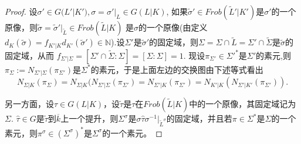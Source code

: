 \documentclass[UTF8]{article}
\begin{document}
\begin{proof}
	设$\sigma'\in G(L'|K'),\sigma=\sigma'|_{L}\in G(L|K)$,
	如果$\tilde{\sigma}'\in Frob(\widetilde{L}'|K')$是$\sigma'$的一个原像，则$\tilde{\sigma}=\tilde{\sigma}'|_{\widetilde{L}}\in Frob(\widetilde{L}|K)$
是$\sigma$的一个原像(由定义$d_{K}(\tilde{\sigma})=f_{K'|K}d_{K'}(\tilde{\sigma}')\in \mathbb{N}$).设$\Sigma'$是$\tilde{\sigma}'$的固定域，则$\Sigma=\Sigma\cap \widetilde{L}=\Sigma'\cap \widetilde{\Sigma}$是$\tilde{\sigma}$的固定域，从而
$f_{\Sigma'|\Sigma}=[\Sigma'\cap \widetilde{\Sigma}:\Sigma]=[\Sigma:\Sigma]=1.$
现设$\pi_{\Sigma'}\in \Sigma'^{*}$是$\Sigma'$的素元,则$\pi_{\Sigma}:=N_{\Sigma'|\Sigma}(\pi_{\Sigma'})$是$\Sigma^{*}$的素元，于是上面左边的交换图由下述等式看出$$
N_{\Sigma|K}(\pi_{\Sigma})=N_{\Sigma|K}(N_{\Sigma'|\Sigma}(\pi_{\Sigma'})=N_{\Sigma'|K}(\pi_{\Sigma'})=N_{K'|K}(N_{\Sigma'|K'}(\pi_{\Sigma'})).
$$

另一方面，设$\tau\in G(L|K)$，设$\tilde{\tau}$是$\tau$在$Frob(\widetilde{L}|K)$中的一个原像，其固定域记为$\Sigma$. $\hat{\tau}\in G$是$\tilde{\tau}$到$\overline{k}$上一个提升，则$\Sigma^{\sigma}$是$\sigma\hat{\tau}\sigma^{-1}|_{\widetilde{L}^{\sigma}}$的固定域，并且若$\pi\in \Sigma^{*}$是$\Sigma$的一个素元，则$\pi^{\sigma}\in (\Sigma^{\sigma})^{*}$是$\Sigma^{\sigma}$的一个素元。


\end{proof}
\end{document}
